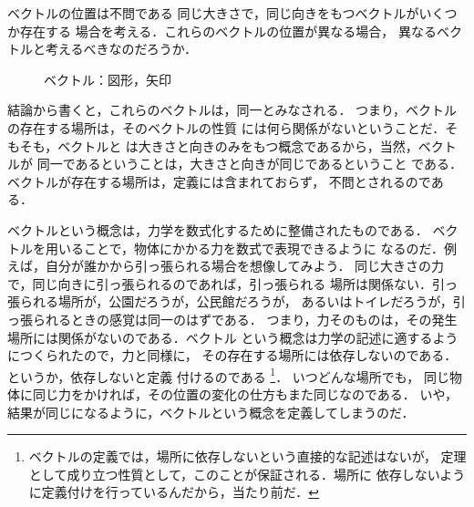             \begin{memo}{ベクトルの位置は不問である}
                同じ大きさで，同じ向きをもつベクトルがいくつか存在する
                場合を考える．これらのベクトルの位置が異なる場合，
                異なるベクトルと考えるべきなのだろうか．
                        \begin{figure}[hbt]
                            \begin{center}
                                \caption{ベクトル：図形，矢印}
                                \label{fig:OnajiVector}
                            \end{center}
                        \end{figure}

                結論から書くと，これらのベクトルは，同一とみなされる．
                つまり，ベクトルの存在する場所は，そのベクトルの性質
                には何ら関係がないということだ．そもそも，ベクトルと
                は大きさと向きのみをもつ概念であるから，当然，ベクトルが
                同一であるということは，大きさと向きが同じであるということ
                である．ベクトルが存在する場所は，定義には含まれておらず，
                不問とされるのである．

                ベクトルという概念は，力学を数式化するために整備されたものである．
                ベクトルを用いることで，物体にかかる力を数式で表現できるように
                なるのだ．例えば，自分が誰かから引っ張られる場合を想像してみよう．
                同じ大きさの力で，同じ向きに引っ張られるのであれば，引っ張られる
                場所は関係ない．引っ張られる場所が，公園だろうが，公民館だろうが，
                あるいはトイレだろうが，引っ張られるときの感覚は同一のはずである．
                つまり，力そのものは，その発生場所には関係がないのである．ベクトル
                という概念は力学の記述に適するようにつくられたので，力と同様に，
                その存在する場所には依存しないのである．というか，依存しないと定義
                付けるのである
                    \footnote{
                        ベクトルの定義では，場所に依存しないという直接的な記述はないが，
                        定理として成り立つ性質として，このことが保証される．場所に
                        依存しないように定義付けを行っているんだから，当たり前だ．
                    }．
                いつどんな場所でも，
                同じ物体に同じ力をかければ，その位置の変化の仕方もまた同じなのである．
                いや，結果が同じになるように，ベクトルという概念を定義してしまうのだ．
            \end{memo}

